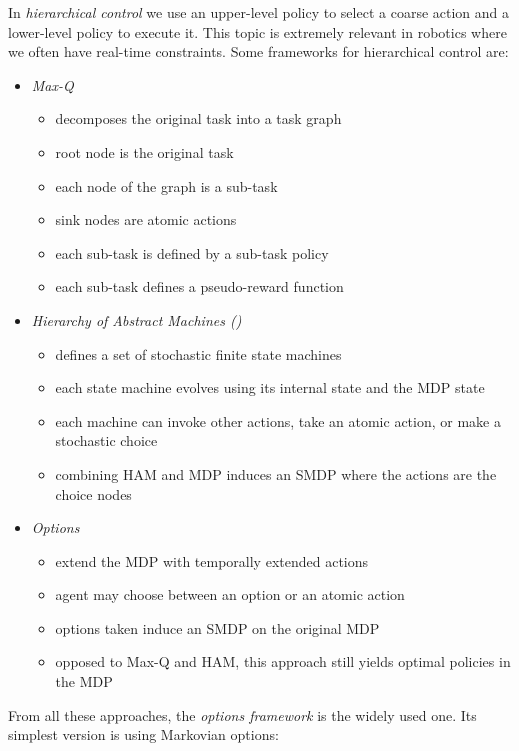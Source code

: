 		In \emph{hierarchical control} we use an upper-level policy to select a coarse action and a lower-level policy to execute it. This topic is extremely relevant in robotics where we often have real-time constraints. Some frameworks for hierarchical control are:
		\begin{itemize}
			\item \emph{Max-Q}
				\begin{itemize}
					\item decomposes the original task into a task graph
					\item root node is the original task
					\item each node of the graph is a sub-task
					\item sink nodes are atomic actions
					\item each sub-task is defined by a sub-task policy
					\item each sub-task defines a pseudo-reward function
				\end{itemize}
			\item \emph{Hierarchy of Abstract Machines ()}
				\begin{itemize}
					\item defines a set of stochastic finite state machines
					\item each state machine evolves using its internal state and the \ac{MDP} state
					\item each machine can invoke other actions, take an atomic action, or make a stochastic choice
					\item combining \ac{HAM} and \ac{MDP} induces an \ac{SMDP} where the actions are the choice nodes
				\end{itemize}
			\item \emph{Options}
				\begin{itemize}
					\item extend the \ac{MDP} with temporally extended actions
					\item agent may choose between an option or an atomic action
					\item options taken induce an \ac{SMDP} on the original \ac{MDP}
					\item opposed to Max-Q and \ac{HAM}, this approach still yields optimal policies in the \ac{MDP}
				\end{itemize}
		\end{itemize}
		From all these approaches, the \emph{options framework} is the widely used one. Its simplest version is using Markovian options:
